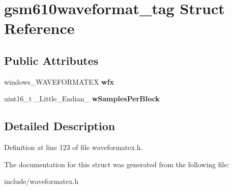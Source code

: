 \hypertarget{structgsm610waveformat__tag}{\section{gsm610waveformat\-\_\-tag Struct Reference}
\label{structgsm610waveformat__tag}
}
\subsection*{Public Attributes}
\begin{DoxyCompactItemize}
\item 
\hypertarget{structgsm610waveformat__tag_ace3d7670cf838aa8e437696975db04f1}{windows\-\_\-\-W\-A\-V\-E\-F\-O\-R\-M\-A\-T\-E\-X {\bfseries wfx}}\label{structgsm610waveformat__tag_ace3d7670cf838aa8e437696975db04f1}

\item 
\hypertarget{structgsm610waveformat__tag_a4506732f74a8a1aee06d0337cd672265}{uint16\-\_\-t \-\_\-\-Little\-\_\-\-Endian\-\_\- {\bfseries w\-Samples\-Per\-Block}}\label{structgsm610waveformat__tag_a4506732f74a8a1aee06d0337cd672265}

\end{DoxyCompactItemize}


\subsection{Detailed Description}


Definition at line 123 of file waveformatex.\-h.



The documentation for this struct was generated from the following file\-:\begin{DoxyCompactItemize}
\item 
include/waveformatex.\-h\end{DoxyCompactItemize}
